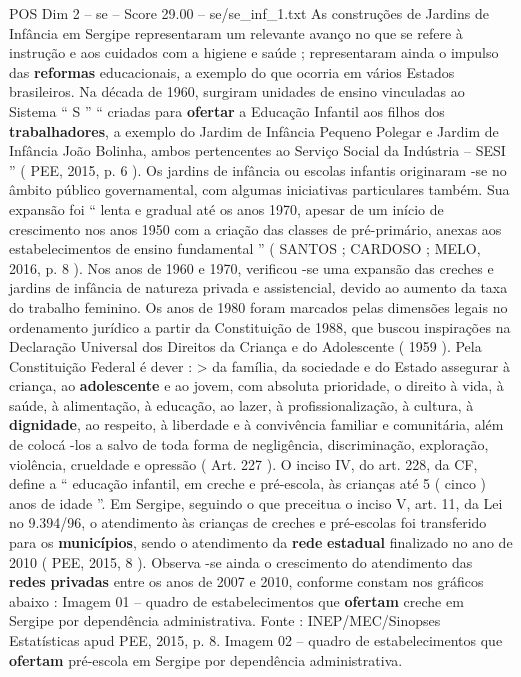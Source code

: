 \begin{textsample}{POS Dim 2 – se – Score 29.00 – se/se\_inf\_1.txt}
As construções de Jardins de Infância em Sergipe representaram um relevante avanço no que se refere à instrução e aos cuidados com a higiene e saúde ; representaram ainda o impulso das \textbf{reformas} educacionais, a exemplo do que ocorria em vários Estados brasileiros.
Na década de 1960, surgiram unidades de ensino vinculadas ao Sistema “ S ” “ criadas para \textbf{ofertar} a Educação Infantil aos filhos dos \textbf{trabalhadores}, a exemplo do Jardim de Infância Pequeno Polegar e Jardim de Infância João Bolinha, ambos pertencentes ao Serviço Social da Indústria – SESI ” ( PEE, 2015, p. 6 ).
Os jardins de infância ou escolas infantis originaram -se no âmbito público governamental, com algumas iniciativas particulares também.
Sua expansão foi “ lenta e gradual até os anos 1970, apesar de um início de crescimento nos anos 1950 com a criação das classes de pré-primário, anexas aos estabelecimentos de ensino fundamental ” ( SANTOS ; CARDOSO ; MELO, 2016, p. 8 ).
Nos anos de 1960 e 1970, verificou -se uma expansão das creches e jardins de infância de natureza privada e assistencial, devido ao aumento da taxa do trabalho feminino.
Os anos de 1980 foram marcados pelas dimensões legais no ordenamento jurídico a partir da Constituição de 1988, que buscou inspirações na Declaração Universal dos Direitos da Criança e do Adolescente ( 1959 ).
Pela Constituição Federal é dever : > da família, da sociedade e do Estado assegurar à criança, ao \textbf{adolescente} e ao jovem, com absoluta prioridade, o direito à vida, à saúde, à alimentação, à educação, ao lazer, à profissionalização, à cultura, à \textbf{dignidade}, ao respeito, à liberdade e à convivência familiar e comunitária, além de colocá -los a salvo de toda forma de negligência, discriminação, exploração, violência, crueldade e opressão ( Art. 227 ).
O inciso IV, do art. 228, da CF, define a “ educação infantil, em creche e pré-escola, às crianças até 5 ( cinco ) anos de idade ”.
Em Sergipe, seguindo o que preceitua o inciso V, art. 11, da Lei no 9.394/96, o atendimento às crianças de creches e pré-escolas foi transferido para os \textbf{municípios}, sendo o atendimento da \textbf{rede} \textbf{estadual} finalizado no ano de 2010 ( PEE, 2015, 8 ).
Observa -se ainda o crescimento do atendimento das \textbf{redes} \textbf{privadas} entre os anos de 2007 e 2010, conforme constam nos gráficos abaixo : Imagem 01 – quadro de estabelecimentos que \textbf{ofertam} creche em Sergipe por dependência administrativa.
Fonte : INEP/MEC/Sinopses Estatísticas apud PEE, 2015, p. 8.
Imagem 02 – quadro de estabelecimentos que \textbf{ofertam} pré-escola em Sergipe por dependência administrativa.

\end{textsample}
